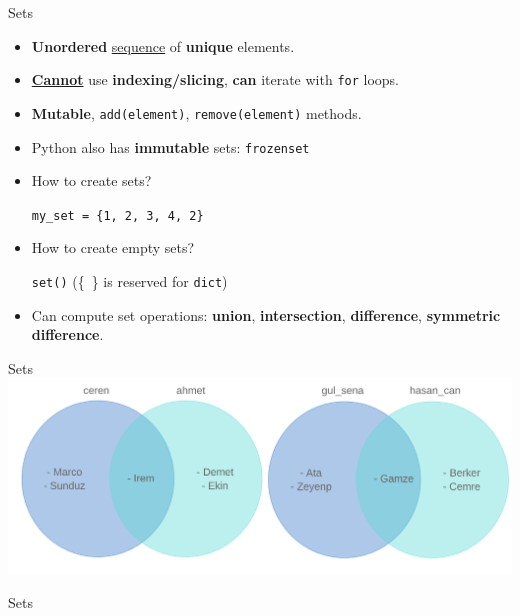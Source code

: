     \begin{frame}{Sets}
        \LARGE
        \begin{itemize}
            \item \textbf{Unordered} \underline{sequence} of \textbf{unique} elements.

            \item \underline{\textbf{Cannot}} use \textbf{indexing/slicing}, \textbf{can} iterate with \texttt{for} loops.

            \item \textbf{Mutable}, \texttt{add(element)}, \texttt{remove(element)} methods.

            \item Python also has \textbf{immutable} sets: \texttt{frozenset}

            \item How to create sets?

             \texttt{my\_set = \{1, 2, 3, 4, 2\}}
            \item How to create empty sets?

             \texttt{set()} (\{\ \} is reserved for \texttt{dict})

            \item Can compute set operations: \textbf{union}, \textbf{intersection}, \textbf{difference}, \textbf{symmetric difference}.
        \end{itemize}
    \end{frame}

    \begin{frame}{Sets}
        \centering
        \includegraphics[width=\textwidth]{../Lecture6/images/sections_venn.png}
    \end{frame}

    \begin{frame}{Sets}
        \inputminted[frame=single,framesep=2pt]{python3}{../Lecture6/code-examples/sets.py}
    \end{frame}

